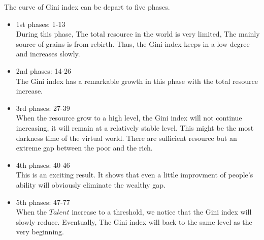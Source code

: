 The curve of Gini index can be depart to five phases.
\begin{itemize}
	\item 1st phases: 1-13\\
	During this phase, The total resource in the world is very limited, The mainly source of grains is from rebirth. Thus, the Gini index keeps in a low degree and increases slowly.
	\item 2nd phases: 14-26\\
	The Gini index has a remarkable growth in this phase with the total resource increase.
	\item 3rd phases: 27-39\\
	When the resource grow to a high level, the Gini index will not continue increasing, it will remain at a relatively stable level. This might be the most darkness time of the virtual world. There are sufficient resource but an extreme gap between the poor and the rich.
	\item 4th phases: 40-46\\
	This is an exciting result. It shows that even a little improvment of people's ability will obviously eliminate the wealthy gap.
	\item 5th phases: 47-77\\
	When the $Talent$ increase to a threshold, we notice that the Gini index will slowly reduce. Eventually, The Gini index will back to the same level as the very beginning.
\end{itemize}
